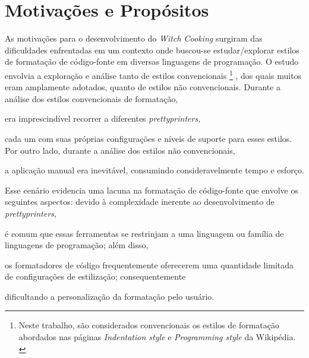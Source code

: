 \documentclass
  [11pt,a4paper,english,brazil,openright,sumario=tradicional,twoside]
  {abntex2}
\newcommand{\witchcooking}{\textit{Witch Cooking}\xspace}
\begin{document}
  \section{Motivações e Propósitos}

  As motivações para o desenvolvimento do \witchcooking surgiram das
  dificuldades enfrentadas em um contexto onde buscou-se estudar/explorar
  estilos de formatação de código-fonte em diversas linguagens de programação.
  O estudo envolvia a exploração e análise tanto de estilos convencionais%
  \footnote
    { Neste trabalho, são considerados convencionais os estilos de formatação
      abordados nas páginas \textit{Indentation style} e
      \textit{Programming style} da Wikipédia.
      \cites{wiki-2023-indentation}{wiki-2023-programming}}%
  , dos quais muitos eram amplamente adotados, quanto de estilos
  não convencionais. Durante a análise dos estilos convencionais de formatação,
  \begin{inparaenum}
    \item era imprescindível recorrer a diferentes \textit{prettyprinters},
    \item cada um com suas próprias configurações e níveis de suporte para
          esses estilos. Por outro lado, durante a análise dos estilos
          não convencionais,
    \item a aplicação manual era inevitável, consumindo consideravelmente tempo
          e esforço.
  \end{inparaenum}

  Esse cenário evidencia uma lacuna na formatação de código-fonte que envolve
  os seguintes aspectos: devido à complexidade inerente ao desenvolvimento de
  \textit{prettyprinters},
  \begin{inparaenum}
    \item é comum que essas ferramentas se restrinjam a uma linguagem ou
          família de linguagens de programação; além disso,
    \item os formatadores de código frequentemente oferecerem uma quantidade
          limitada de configurações de estilização; consequentemente
    \item dificultando a personalização da formatação pelo usuário.
  \end{inparaenum}
\end{document}
